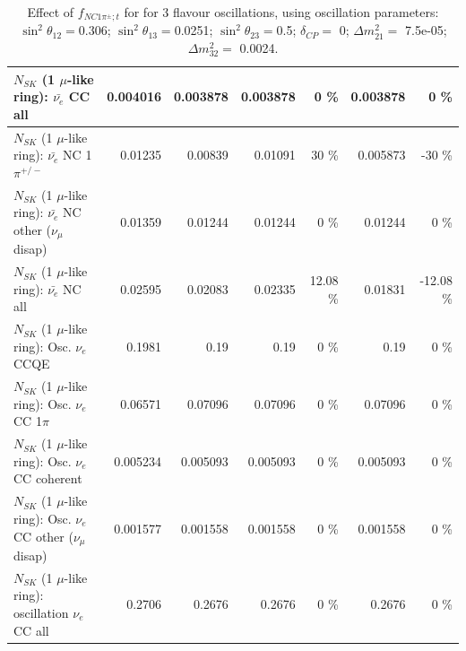 \begin{table}
\begin{tabular}{| l | r | r | r  r | r  r |}
                            $N_{SK}$ (1 $\mu$-like ring): $\bar{\nu_{e}}$ CC all &        0.004016 &        0.003878 &        0.003878 &        0 \%  &        0.003878 &        0 \%  \\ 
\hline
                     $N_{SK}$ (1 $\mu$-like ring): $\bar{\nu_e}$ NC 1$\pi^{+/-}$ &         0.01235 &         0.00839 &         0.01091 &       30 \%  &        0.005873 &      -30 \%  \\ 
          $N_{SK}$ (1 $\mu$-like ring): $\bar{\nu_e}$ NC other ($\nu_\mu$ disap) &         0.01359 &         0.01244 &         0.01244 &        0 \%  &         0.01244 &        0 \%  \\ 
                            $N_{SK}$ (1 $\mu$-like ring): $\bar{\nu_{e}}$ NC all &         0.02595 &         0.02083 &         0.02335 &    12.08 \%  &         0.01831 &   -12.08 \%  \\ 
\hline
\hline
\hline
                                 $N_{SK}$ (1 $\mu$-like ring): Osc. $\nu_e$ CCQE &          0.1981 &            0.19 &            0.19 &        0 \%  &            0.19 &        0 \%  \\ 
                            $N_{SK}$ (1 $\mu$-like ring): Osc. $\nu_e$ CC 1$\pi$ &         0.06571 &         0.07096 &         0.07096 &        0 \%  &         0.07096 &        0 \%  \\ 
                          $N_{SK}$ (1 $\mu$-like ring): Osc. $\nu_e$ CC coherent &        0.005234 &        0.005093 &        0.005093 &        0 \%  &        0.005093 &        0 \%  \\ 
           $N_{SK}$ (1 $\mu$-like ring): Osc. $\nu_e$ CC other ($\nu_\mu$ disap) &        0.001577 &        0.001558 &        0.001558 &        0 \%  &        0.001558 &        0 \%  \\ 
                        $N_{SK}$ (1 $\mu$-like ring): oscillation $\nu_e$ CC all &          0.2706 &          0.2676 &          0.2676 &        0 \%  &          0.2676 &        0 \%  \\ 
\hline
\hline
\end{tabular}
\caption{ Effect of $f_{NC1\pi^\pm; t}$ for for 3 flavour oscillations, using oscillation parameters:  $\sin^2\theta_{12} = $0.306; $\sin^2\theta_{13} = $0.0251; $\sin^2\theta_{23} = $0.5; $\delta_{CP} = $        0; $\Delta m^2_{21} = $    7.5e-05; $\Delta m^2_{32} = $    0.0024. }
\label{tab:num_xsec_norm_nc1piC_1RmuT_3f_osc_t13:0.0251}
\end{table}
\clearpage
